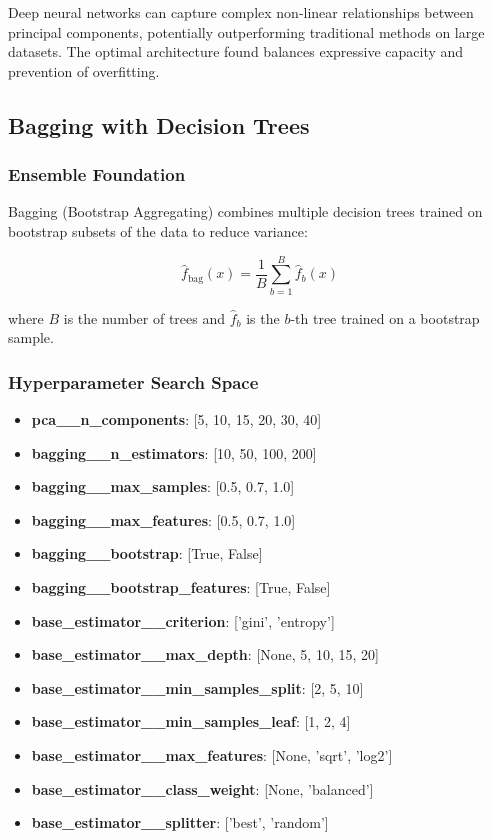 \documentclass[12pt,a4paper]{article}
\begin{document}
Deep neural networks can capture complex non-linear relationships between principal components, potentially outperforming traditional methods on large datasets. The optimal architecture found balances expressive capacity and prevention of overfitting.

\subsection{Bagging with Decision Trees}

\subsubsection{Ensemble Foundation}

Bagging (Bootstrap Aggregating) combines multiple decision trees trained on bootstrap subsets of the data to reduce variance:

\begin{equation}
\hat{f}_{\text{bag}}(x) = \frac{1}{B} \sum_{b=1}^{B} \hat{f}_b(x)
\end{equation}

where $B$ is the number of trees and $\hat{f}_b$ is the $b$-th tree trained on a bootstrap sample.

\subsubsection{Hyperparameter Search Space}

\begin{itemize}
    \item \textbf{pca\_\_n\_components}: [5, 10, 15, 20, 30, 40]
    \item \textbf{bagging\_\_n\_estimators}: [10, 50, 100, 200]
    \item \textbf{bagging\_\_max\_samples}: [0.5, 0.7, 1.0]
    \item \textbf{bagging\_\_max\_features}: [0.5, 0.7, 1.0]
    \item \textbf{bagging\_\_bootstrap}: [True, False]
    \item \textbf{bagging\_\_bootstrap\_features}: [True, False]
    \item \textbf{base\_estimator\_\_criterion}: ['gini', 'entropy']
    \item \textbf{base\_estimator\_\_max\_depth}: [None, 5, 10, 15, 20]
    \item \textbf{base\_estimator\_\_min\_samples\_split}: [2, 5, 10]
    \item \textbf{base\_estimator\_\_min\_samples\_leaf}: [1, 2, 4]
    \item \textbf{base\_estimator\_\_max\_features}: [None, 'sqrt', 'log2']
    \item \textbf{base\_estimator\_\_class\_weight}: [None, 'balanced']
    \item \textbf{base\_estimator\_\_splitter}: ['best', 'random']
\end{itemize}
\end{document}

